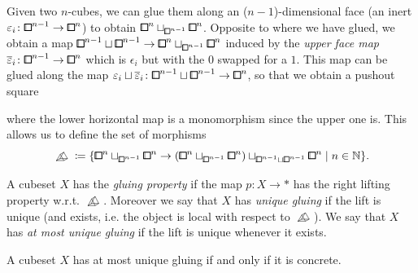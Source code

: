 Given two $n$-cubes, we can glue them along an ($n-1$)-dimensional face (an inert $\epsilon_i\colon{\bbox}^{n-1}\to{\bbox}^n$) to obtain ${\bbox}^n\sqcup_{{\bbox}^{n-1}}{\bbox}^n$.
Opposite to where we have glued, we obtain a map ${\bbox}^{n-1}\sqcup{\bbox}^{n-1}\to{\bbox}^n\sqcup_{{\bbox}^{n-1}}{\bbox}^n$ induced by the \emph{upper face map} $\overline{\epsilon}_i\colon{\bbox}^{n-1}\to{\bbox}^n$
which is $\epsilon_i$ but with the $0$ swapped for a $1$.
This map can be glued along the map $\epsilon_i\sqcup\overline{\epsilon}_i\colon{\bbox}^{n-1}\sqcup{\bbox}^{n-1}\to{\bbox}^n$,
so that we obtain a pushout square
\begin{center}
\end{center}
where the lower horizontal map is a monomorphism since the upper one is.
This allows us to define the set of morphisms
\[
    \bprism\coloneq \{ {{\bbox}^{n}\sqcup_{{\bbox}^{n-1}}{\bbox}^{n}}\to{({\bbox}^{n}\sqcup_{{\bbox}^{n-1}}{\bbox}^{n})\sqcup_{{\bbox}^{n-1}\sqcup{\bbox}^{n-1}}{\bbox}^n} \mid n\in\N \}.
\]

\begin{definition}\label{def:gluing-property}
A cubeset $X$ has the \emph{gluing property} if the map $p\colon X\to\ast$ has the right lifting property w.r.t. $\bprism$.
Moreover we say that $X$ has \emph{unique gluing} if the lift is unique (and exists, i.e. the object is local with respect to $\bprism$).
	We say that $X$ has \emph{at most unique gluing} if the lift is unique whenever it exists.
\end{definition}

\begin{proposition}\label{prop:unique-gluing-concrete}
A cubeset $X$ has at most unique gluing if and only if it is concrete.
\end{proposition}

